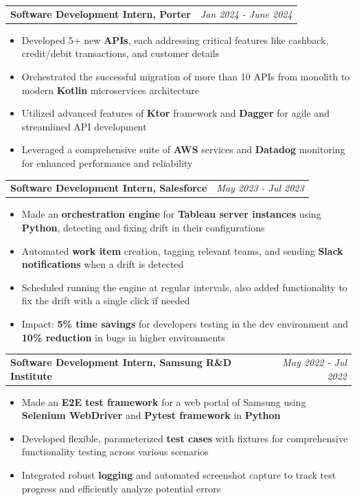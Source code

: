 \documentclass[a4paper,11pt]{article}
\makeatletter
\newcommand{\resumeExp}[4]{
\vspace{0mm}\item[]
    \begin{tabular*}{\textwidth}[t]{l@{\extracolsep{\fill}}r}
        \hspace{-4.4mm} \small\textbf{#1} & {\textit{\footnotesize{#3}}}
    \end{tabular*}
    \vspace{-9mm}
}
\newcommand{\resumeItemListStart}{\begin{justify}\begin{itemize}[leftmargin=3ex, rightmargin=2ex, noitemsep,labelsep=1.2mm,itemsep=0mm]\small}
\newcommand{\resumeItemListEnd}{\end{itemize}\end{justify}\vspace{-1.5mm}}
\makeatother
\begin{document}
{\resumeExp
{Software Development Intern, Porter }
{\textit{Persistent Disk - Snapshots}}
{Jan 2024 - June 2024}
{}
\resumeItemListStart
\item[$\bullet$] Developed 5+ new \textbf{APIs}, each addressing critical features like cashback, credit/debit transactions, and customer details
\item[$\bullet$] Orchestrated the successful migration of more than 10 APIs from monolith to modern \textbf{Kotlin} microservices architecture
\item[$\bullet$] Utilized advanced features of \textbf{Ktor} framework and \textbf{Dagger} for agile and streamlined API development
\item[$\bullet$]  Leveraged a comprehensive suite of \textbf{AWS} services and \textbf{Datadog} monitoring for enhanced performance and reliability
\resumeItemListEnd

\vspace{1mm} 

\resumeExp
{Software Development Intern, Salesforce }
{\textit{Persistent Disk - Snapshots}}
{May 2023 - Jul 2023}
{}
\resumeItemListStart
\item[$\bullet$]  Made an \textbf{orchestration engine} for \textbf{Tableau server instances} using \textbf{Python}, detecting and fixing drift in their configurations

\item[$\bullet$] Automated \textbf{work item} creation, tagging relevant teams, and sending \textbf{Slack notifications} when a drift is detected
\item[$\bullet$] Scheduled running the engine at regular intervals, also added functionality to fix the drift with a single click if needed
\item[$\bullet$] Impact:\textbf{ 5\% time savings} for developers testing in the dev environment and \textbf{10\% reduction} in bugs in higher environments
\resumeItemListEnd

\vspace{1mm} 

\resumeExp
{Software Development Intern, Samsung R\&D Institute}
{\textit{Safe-Chat Application}}
{May 2022 - Jul 2022}
{}
\resumeItemListStart
\item[$\bullet$] Made an \textbf{E2E test framework} for a web portal of Samsung using \textbf{Selenium WebDriver} and \textbf{Pytest framework} in \textbf{Python}
\item[$\bullet$] Developed flexible, parameterized \textbf{test cases} with fixtures for comprehensive functionality testing across various scenarios
\item[$\bullet$] Integrated robust \textbf{logging} and automated screenshot capture to track test progress and efficiently analyze potential errors
\resumeItemListEnd

}
\end{document}
